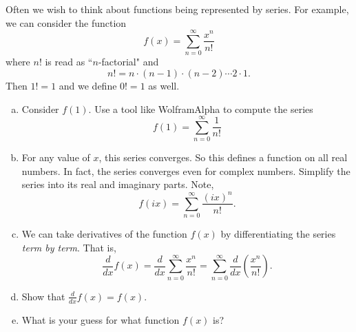 \documentclass[12pt]{article} %
\begin{document}
\begin{problem}
Often we wish to think about functions being represented by series.  For example, we can consider the function
\[
f(x)=\sum_{n=0}^\infty \frac{x^n}{n!}
\]
where $n!$ is read as ``$n$-factorial" and 
\[
n! = n\cdot (n-1)\cdot (n-2) \cdots 2 \cdot 1.
\]
Then $1!=1$ and we define $0!=1$ as well.
\begin{enumerate}[(a)]
    \item Consider $f(1)$.  Use a tool like WolframAlpha to compute the series
    \[
    f(1)=\sum_{n=0}^\infty \frac{1}{n!}
    \]
    \item For any value of $x$, this series converges. So this defines a function on all real numbers. In fact, the series converges even for complex numbers. Simplify the series into its real and imaginary parts. Note,
    \[
    f(ix) = \sum_{n=0}^\infty \frac{(ix)^n}{n!}.
    \]
    \item We can take derivatives of the function $f(x)$ by differentiating the series \emph{term by term}. That is,
    \[
    \frac{d}{dx} f(x) = \frac{d}{dx} \sum_{n=0}^\infty \frac{x^n}{n!} = \sum_{n=0}^\infty \frac{d}{dx} \left( \frac{ x^n}{n!}\right).
    \]
    \item Show that $\frac{d}{dx}f(x)=f(x)$.
    \item What is your guess for what function $f(x)$ is?
\end{enumerate}
\end{problem}
\end{document}
